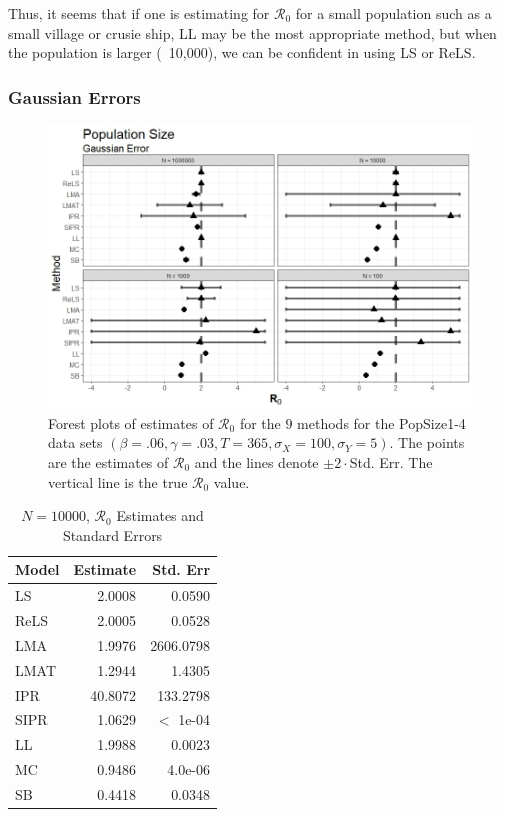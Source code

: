 \documentclass[12pt]{article}
\newcommand{\xxsir}{\ensuremath{9} } %
\newcommand{\rr}{\ensuremath{\mathcal{R}_0}}
\begin{document}
Thus, it seems that if one is estimating for $\rr$ for a small population such as a small village or crusie ship, LL may be the most appropriate method, but when the population is larger (~10,000), we can be confident in using LS or ReLS.

\subsubsection{Gaussian Errors}

\begin{figure}[H]
	\centering
	\includegraphics[scale=0.5]{images/popsize_n.jpeg}
	\caption{Forest plots of estimates of $\rr$ for the \xxsir methods for the PopSize1-4 data sets $(\beta=.06, \gamma=.03, T=365, \sigma_X=100, \sigma_Y=5)$.  The points are the estimates of $\rr$ and the lines denote $\pm 2\cdot $Std. Err.  The vertical line is the true $\rr$ value.}\label{fig:inits-res2}
\end{figure}

\begin{table}[H]
	
	\centering
	\begin{tabular}[t]{l|r|r}
		\hline
		Model & Estimate & Std. Err\\
		\hline
		LS & 2.0008 & 0.0590\\
		\hline
		ReLS & 2.0005 & 0.0528\\
		\hline
		LMA & 1.9976 & 2606.0798\\
		\hline
		LMAT & 1.2944 & 1.4305\\
		\hline
		IPR & 40.8072 & 133.2798\\
		\hline
		SIPR & 1.0629 &  $<$ 1e-04\\
		\hline
		LL & 1.9988 & 0.0023\\
		\hline
		MC & 0.9486 & 4.0e-06\\
		\hline
		SB & 0.4418 & 0.0348\\
		\hline
	\end{tabular}
\caption{$N = 10000$, $\rr$ Estimates and Standard Errors}\label{tab:n1-res2}
\end{table}
\end{document}
